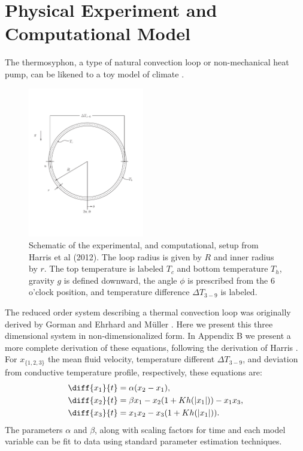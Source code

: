 \section{Physical Experiment and Computational Model}

The thermosyphon, a type of natural convection loop or non-mechanical heat pump, can be likened to a toy model of climate \cite{harris2011predicting}.
\begin{figure}[t!]
  \centering
  \includegraphics[width=0.45\textwidth]{figures/harris-tellus-2012-loop.pdf}
  \caption[Schematic of the experimental, and computational, setup from Harris et al (2012)]{
    Schematic of the experimental, and computational, setup from Harris et al (2012).
    The loop radius is given by $R$ and inner radius by $r$.
    The top temperature is labeled $T_c$ and bottom temperature $T_h$, gravity $g$ is defined downward, the angle $\phi$ is prescribed from the 6 o'clock position, and temperature difference $\Delta T_{3-9}$ is labeled.
  }
  \label{fig:thermosyphons}
\end{figure}

The reduced order system describing a thermal convection loop was originally derived by Gorman \cite{gorman1986} and Ehrhard and M\"{u}ller \cite{ehrhard1990dynamical}.
Here we present this three dimensional system in non-dimensionalized form.
In Appendix B we present a more complete derivation of these equations, following the derivation of Harris \cite{harris2011predicting}.
For $x_{\{1,2,3\}}$ the mean fluid velocity, temperature different $\Delta T_{3-9}$, and deviation from conductive temperature profile, respectively, these equations are:
\begin{align}
& \diff{x_1}{t} = \alpha (x_2 - x_1),\\
& \diff{x_2}{t} = \beta x_1 - x_2 (1 + Kh(|x_1|)) - x_1x_3,\\
& \diff{x_3}{t} = x_1x_2 - x_3 (1 + Kh(|x_1|)) .\end{align}
The parameters $\alpha$ and $\beta$, along with scaling factors for time and each model variable can be fit to data using standard parameter estimation techniques.


